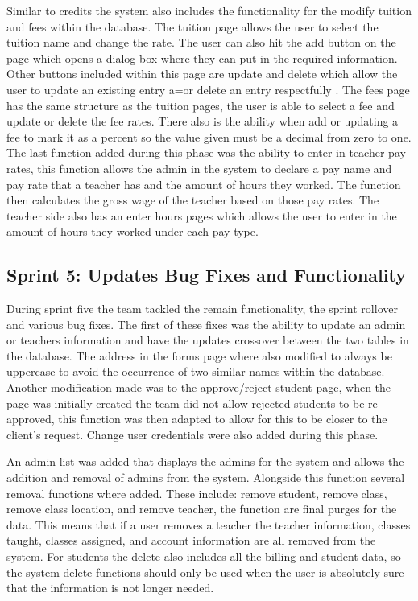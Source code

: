 Similar to credits the system also includes the functionality for the modify tuition and fees within the database. The tuition page allows the user to select the tuition name and change the rate. The user can also hit the add button on the page which opens a dialog box where they can put in the required information. Other buttons included within this page are update and delete which allow the user to update an existing entry a=or delete an entry respectfully . The fees page has the same structure as the tuition pages, the user is able to select a fee and update or delete the fee rates. There also is the ability when add or updating a fee to mark it as a percent so the value given must be a decimal from zero to one. The last function added during this phase was the ability to enter in teacher pay rates, this function allows the admin in the system to declare a pay name and pay rate that a teacher has and the amount of hours they worked. The function then calculates the gross wage of the teacher based on those pay rates. The teacher side also has an enter hours pages which allows the user to enter in the amount of hours they worked under each pay type.  

\subsection{Sprint 5: Updates Bug Fixes and Functionality}
During sprint five the team tackled the remain functionality, the sprint rollover and various bug fixes. The first of these fixes was the ability to update an admin or teachers information and have the updates crossover between the two tables in the database. The address in the forms page where also modified to always be uppercase to avoid the occurrence of two similar names within the database. Another modification made was to the approve/reject student page, when the page was initially created the team did not allow rejected students to be re approved, this function was then adapted to allow for this to be closer to the client's request. Change user credentials were also added during this phase.

An admin list was added that displays the admins for the system and allows the addition and removal of admins from the system. Alongside this function several removal functions where added. These include: remove student, remove class, remove class location, and remove teacher, the function are final purges for the data. This means that if a user removes a teacher the teacher information, classes taught, classes assigned, and account information are all removed from the system. For students the delete also includes all the billing and student data, so the system delete functions should only be used when the user is absolutely sure that the information is not longer needed.

